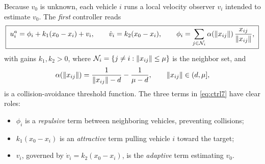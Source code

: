 Because $v_0$ is unknown, each vehicle $i$ runs a local velocity observer $v_i$ intended to estimate
$v_0$. The \emph{first} controller reads
\begin{equation}
  \boxed{\; u_i^a=\phi_i+k_1(x_0-x_i)+v_i, \qquad
  \dot{v}_i=k_2(x_0-x_i), \qquad
  \phi_i=\sum_{j\in\mathcal{N}_i}\alpha(\left\| x_{ij} \right\|)\,\frac{x_{ij}}{\left\| x_{ij} \right\|}, \;}
  \label{eq:ctrl7}
\end{equation}
with gains $k_1,k_2>0$, where $\mathcal{N}_i=\{j\ne i:\left\| x_{ij} \right\|\le\mu\}$ is the neighbor set, and
\begin{equation}
  \alpha(\left\| x_{ij} \right\|)=\frac{1}{\left\| x_{ij} \right\|-d}-\frac{1}{\mu-d},
  \qquad \left\| x_{ij} \right\|\in(d,\mu],
  \label{eq:alpha}
\end{equation}
is a collision-avoidance threshold function. The three terms in \eqref{eq:ctrl7} have clear roles:
\begin{itemize}[leftmargin=2em]
  \item $\phi_i$ is a \emph{repulsive} term between neighboring vehicles, preventing collisions;
  \item $k_1(x_0-x_i)$ is an \emph{attractive} term pulling vehicle $i$ toward the target;
  \item $v_i$, governed by $\dot{v}_i=k_2(x_0-x_i)$, is the \emph{adaptive} term estimating $v_0$.
\end{itemize}

